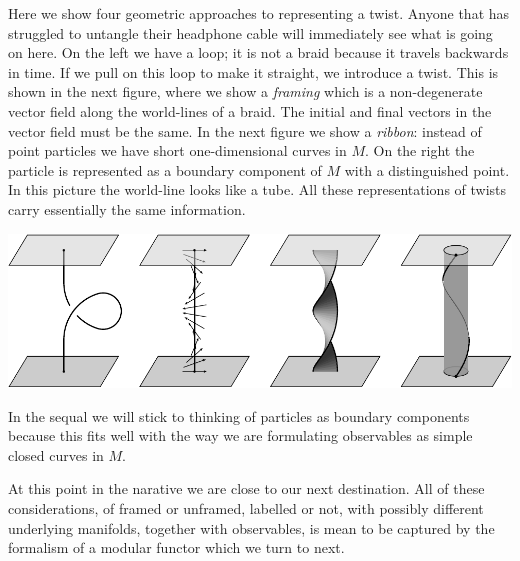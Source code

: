 \documentclass[aps, prl, letterpaper, twocolumn, superscriptaddress, notitlepage, 10pt]{revtex4-1}
\begin{document}
Here we show four 
geometric approaches to representing a twist.
Anyone that has struggled to untangle their headphone cable
will immediately see what is going on here.
On the left we have a loop; it is not a braid because it
travels backwards in time.
If we pull on this loop to make it straight, we introduce a twist.
This is shown in the next figure, 
where we show a \emph{framing} which is a non-degenerate
vector field along the world-lines of a braid.
The initial and final vectors in the vector field must be the same.
In the next figure we show a \emph{ribbon}:
instead of point particles we have short one-dimensional curves in $M$.
On the right the particle is represented as a boundary
component of $M$ with a distinguished point.
In this picture the world-line looks like a tube.
All these representations of twists carry
essentially the same information.
\begin{center}
\includegraphics[]{pic-framed.pdf}
\end{center}
In the sequal we will stick
to thinking of particles as boundary
components because this fits well
with the way we are formulating 
observables as simple closed curves in $M$.

At this point in the narative we are 
close to our next destination.
All of these considerations,
of framed or unframed, 
labelled or not,
with possibly different underlying manifolds,
together with observables,
is mean to
be captured by the formalism of a modular functor which we turn to next.


%
%
\end{document}
